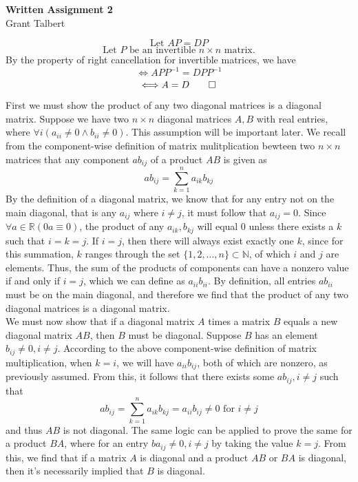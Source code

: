 \documentclass{article}
\begin{document}
\large

\thispagestyle{fancy}
\pagestyle{fancy}
\begin{center}

\textbf{Written Assignment 2}\\
Grant Talbert
\end{center}
\[
    \text{Let } AP=DP 
\]
\[
    \text{Let }P\text{ be an invertible }n\times n\text{ matrix.} 
\]
By the property of right cancellation for invertible matrices, we have 
\[
    \Longleftrightarrow APP^{-1} =DPP^{-1} 
\]
\[
    \Longleftrightarrow A=D\qed
\]

 First we must show the product of any two diagonal matrices is a diagonal matrix. Suppose we have two \(n\times n\) diagonal matrices \(A,B\) with real entries, where \(\forall i(a_{ii}\neq0\land b_{ii}\neq0)\). This assumption will be important later.
We recall from the component-wise definition of matrix mulitplication bewteen two \(n\times n\) matrices that any component \(ab_{ij} \) of a product \(AB\) is given as
\[
    ab_{ij}=\sum_{k=1}^n  a_{ik}b_{kj}  
\]
By the definition of a diagonal matrix, we know that for any entry not on the main diagonal, that is any \(a_{ij}\) where \(i\neq j\), it must follow that \(a_{ij}=0 \). Since \(\forall a\in\mathbb{R} (0a\equiv 0)\), the product of any \(a_{ik},b_{kj}  \) will equal 0 unless there exists a \(k\) such that \(i=k=j\).
If \(i=j\), then there will always exist exactly one \(k\), since for this summation, \(k\) ranges through the set \(\{ 1,2,\ldots,n \}\subset\mathbb{N}  \), of which \(i\) and \(j\) are elements. Thus, the sum of the products of components can have a nonzero value if and only if \(i=j\), which we can define as \(a_{ii}b_{ii}\). By definition, all entries \(ab_{ii}\) must be on the main diagonal, and therefore we find that the product of any two diagonal matrices is a diagonal matrix.\\
We must now show that if a diagonal matrix \(A\) times a matrix \(B\) equals a new diagonal matrix \(AB\), then \(B\) must be diagonal. Suppose \(B\) has an element \(b_{ij}\neq 0,i\neq j \). According to the above component-wise definition of matrix multiplication, when \(k=i\), we will have \(a_{ii}b_{ij}  \), both of which are nonzero, as previously assumed. From this, it follows that there exists some \(ab_{ij},i\neq j \) such that
\[
    ab_{ij} =\sum_{k=1}^n a_{ik}b_{kj}=a_{ii}b_{ij}  \neq 0\text{ for }i\neq j
\]
and thus \(AB\) is not diagonal. The same logic can be applied to prove the same for a product \(BA\), where for an entry \(ba_{ij}\neq 0,i\neq j \) by taking the value \(k=j\). From this, we find that if a matrix \(A\) is diagonal and a product \(AB\text{ or } BA\) is diagonal, then it's necessarily implied that \(B\) is diagonal.\\
\end{document}
